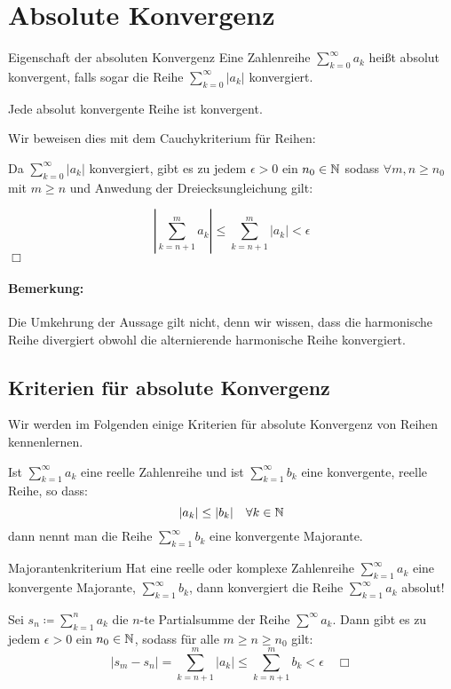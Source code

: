\section{Absolute Konvergenz}
\begin{definition}{Eigenschaft der absoluten Konvergenz}
	Eine Zahlenreihe $\sum_{k=0}^\infty a_k$ heißt absolut konvergent, falls sogar die Reihe $\sum_{k=0}^\infty |a_k|$ konvergiert.
\end{definition}
\begin{satz}{}
	Jede absolut konvergente Reihe ist konvergent.
\end{satz}
\beweis
Wir beweisen dies mit dem Cauchykriterium für Reihen:

Da $\sum_{k=0}^\infty |a_k|$ konvergiert, gibt es zu jedem $\epsilon > 0$ ein $n_0\in\mathbb{N}$ sodass $\forall m,n\geq n_0$ mit $m\geq n$ und Anwedung der Dreiecksungleichung gilt:

\begin{equation*}
	\left|\sum\limits_{k=n+1}^m a_k\right|\leq\sum\limits_{k=n+1}^m |a_k|<\epsilon
\end{equation*}
\hfill$\Box$

\paragraph{Bemerkung:}
Die Umkehrung der Aussage gilt nicht, denn wir wissen, dass die harmonische Reihe divergiert obwohl die alternierende harmonische Reihe konvergiert.




\subsection{Kriterien für absolute Konvergenz}
Wir werden im Folgenden einige Kriterien für absolute Konvergenz von Reihen kennenlernen.
\begin{definition}{}
	Ist $\sum_{k=1}^\infty a_k$ eine reelle Zahlenreihe und ist $\sum_{k=1}^\infty b_k$ eine konvergente, reelle Reihe, so dass:
	\begin{equation*}
		|a_k|\leq|b_k| \quad \forall k\in\mathbb{N}
	\end{equation*}
	dann nennt man die Reihe $\sum_{k=1}^\infty b_k$ eine konvergente Majorante.
\end{definition}

\begin{satz}{Majorantenkriterium}
	Hat eine reelle oder komplexe Zahlenreihe $\sum_{k=1}^\infty a_k$ eine konvergente Majorante, $\sum_{k=1}^\infty b_k$, dann konvergiert die Reihe $\sum_{k=1}^\infty a_k$ absolut!
\end{satz}
\beweis
Sei $s_n\coloneqq \sum_{k=1}^n a_k$ die $n$-te Partialsumme der Reihe $\sum^\infty a_k$. Dann gibt es zu jedem $\epsilon>0$ ein $n_0\in\mathbb{N}$, sodass für alle $m\geq n\geq n_0$ gilt:
\begin{equation*}
	|s_m-s_n|=\sum_{k=n+1}^m |a_k|\leq \sum_{k=n+1}^m b_k <\epsilon \quad\Box
\end{equation*}

